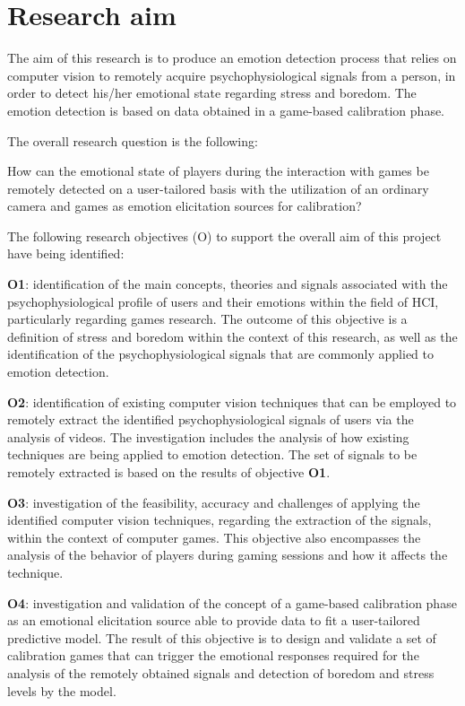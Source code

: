 \section{Research aim}
\label{sec:research-aim}

The aim of this research is to produce an emotion detection process that relies on computer vision to remotely acquire psychophysiological signals from a person, in order to detect his/her emotional state regarding stress and boredom. The emotion detection is based on data obtained in a game-based calibration phase.

The overall research question is the following:

\begin{fquote}
How can the emotional state of players during the interaction with games be remotely detected on a user-tailored basis with the utilization of an ordinary camera and games as emotion elicitation sources for calibration?
\end{fquote}

The following research objectives (O) to support the overall aim of this project have being identified:

\textbf{O1}: identification of the main concepts, theories and signals associated with the psychophysiological profile of users and their emotions within the field of HCI, particularly regarding games research. The outcome of this objective is a definition of stress and boredom within the context of this research, as well as the identification of the psychophysiological signals that are commonly applied to emotion detection.

\textbf{O2}: identification of existing computer vision techniques that can be employed to remotely extract the identified psychophysiological signals of users via the analysis of videos. The investigation includes the analysis of how existing techniques are being applied to emotion detection. The set of signals to be remotely extracted is based on the results of objective \textbf{O1}.

\textbf{O3}: investigation of the feasibility, accuracy and challenges of applying the identified computer vision techniques, regarding the extraction of the signals, within the context of computer games. This objective also encompasses the analysis of the behavior of players during gaming sessions and how it affects the technique.

\textbf{O4}: investigation and validation of the concept of a game-based calibration phase as an emotional elicitation source able to provide data to fit a user-tailored predictive model. The result of this objective is to design and validate a set of calibration games that can trigger the emotional responses required for the analysis of the remotely obtained signals and detection of boredom and stress levels by the model.

